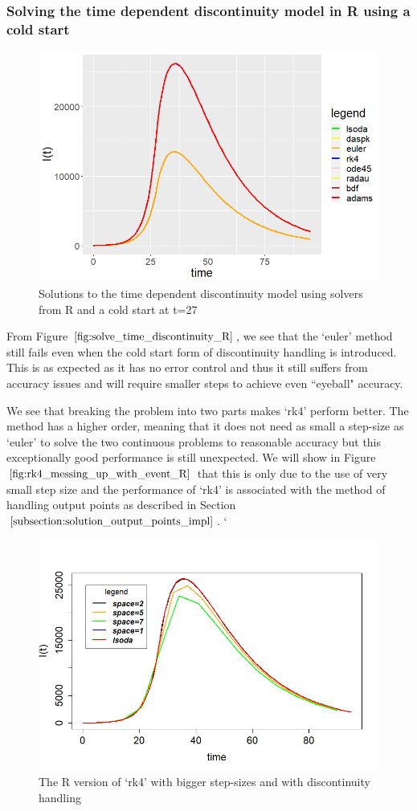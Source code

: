 \subsubsection{Solving the time dependent discontinuity model in R using a cold start} 
\begin{figure}[H]
\centering
\includegraphics[width=0.7\linewidth]{./figures/solve_time_discontinuity_R}
\caption{Solutions to the time dependent discontinuity model using solvers from R and a cold start at t=27}
\label{fig:solve_time_discontinuity_R}
\end{figure}
From Figure $\ref{fig:solve_time_discontinuity_R}$, we see that the `euler' method still fails even when the cold start form of discontinuity handling is introduced. This is as expected as it has no error control and thus it still suffers from accuracy issues and will require smaller steps to achieve even ``eyeball" accuracy.

We see that breaking the problem into two parts makes `rk4' perform better. The method has a higher order, meaning that it does not need as small a step-size as `euler' to solve the two continuous problems to reasonable accuracy but this exceptionally good performance is still unexpected. We will show in Figure $\ref{fig:rk4_messing_up_with_event_R}$ that this is only due to the use of very small step size and the performance of `rk4' is associated with the method of handling output points as described in Section $\ref{subsection:solution_output_points_impl}$.
`
\begin{figure}[H]
\centering
\includegraphics[width=0.7\linewidth]{./figures/rk4_messing_up_with_event_R}
\caption{The R version of `rk4' with bigger step-sizes and with discontinuity handling}
\label{fig:rk4_messing_up_with_event_R}
\end{figure}

